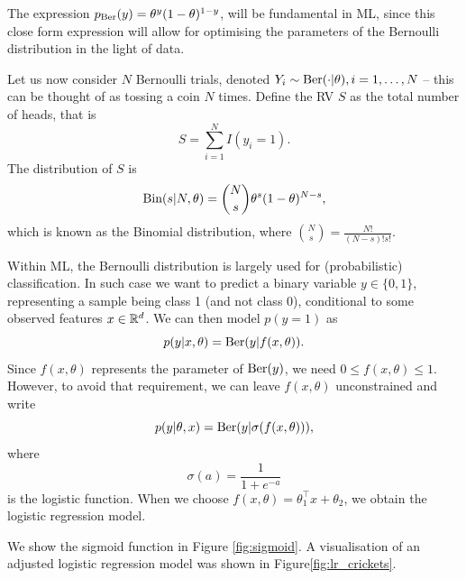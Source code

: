 \begin{mdframed}[style=discusion, frametitle={Bernoulli likelihood}]

The expression $p_{\text{Ber}}(y) = \theta^y(1-\theta)^{1-y}$, will be fundamental in ML, since this close form expression will allow for optimising the parameters of the Bernoulli distribution in the light of data.

\end{mdframed}


Let us now consider $N$ Bernoulli trials, denoted $Y_i\sim \text{Ber}(\cdot|\theta), i=1,\ldots,N$ -- this can be thought of as tossing a coin $N$ times. Define the RV $S$ as the total number of heads, that is
\begin{equation}
 	S = \sum_{i=1}^N I(y_i = 1).
 \end{equation} 
 The distribution of $S$ is 
 \begin{equation}
 	\text{Bin}(s|N,\theta) = \binom{N}{s}\theta^s(1-\theta)^{N-s},
 \end{equation}
which is known as the Binomial distribution, where $\binom{N}{s} = \frac{N!}{(N-s)!s!}$.

\begin{example}

Within ML, the Bernoulli distribution is largely used for (probabilistic) classification. In such case we want to predict a binary variable $y\in\{0,1\}$, representing a sample being class 1 (and not class 0), conditional to some observed features $x\in\mathbb{R}^d$. We can then model $p(y=1)$ as 
\begin{equation}
	p(y|x,\theta) = \text{Ber}(y|f(x,\theta)).
\end{equation}
Since $f(x,\theta)$ represents the parameter of $\text{Ber}(y)$, we need $0\leq f(x,\theta) \leq 1$. However, to avoid that requirement, we can leave $f(x,\theta)$ unconstrained and write 
\begin{equation}
	p(y|\theta,x) = \text{Ber}(y|\sigma(f(x,\theta))),
\end{equation}
where 
\begin{equation}
	\sigma(a) = \frac{1}{1+e^{-a}}
\end{equation}
is the logistic function. 
When we choose $f(x,\theta) = \theta_1^\top x + \theta_2$, we obtain the logistic regression model.

We show the sigmoid function in Figure \ref{fig:sigmoid}. A visualisation of an adjusted logistic regression model was shown in Figure\ref{fig:lr_crickets}.
\end{example}

